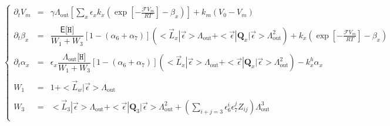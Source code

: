 \documentclass[aps,onecolumn,11pt]{revtex4}
\newcommand{\mychem}[1]{\mathtt{#1}}
\newcommand{\myconc}[1]{\big[#1\big]}
\newcommand{\Faraday}{\mathcal{F}}
\newcommand{\spproton}{\mychem{H}}
\newcommand{\proton}{\myconc{\spproton}}
\newcommand{\myout}[1]{{#1}_{\mathrm{out}}}
\newcommand{\mymat}[1]{{\bm{#1}}}
\newcommand{\LiAll}{\Lambda}
\newcommand{\LiAllOut}{\myout{\LiAll}}
\begin{document}
\begin{equation}
\left\lbrace
\begin{array}{rcl}
\partial_t V_m & = & \gamma\LiAllOut \left[\sum_x \epsilon_x k_x \left( \exp\left[ -\frac{\Faraday V_m}{RT}\right] -\beta_x \right)  \right] + k_m\left(V_0-V_m\right)\\
\\
	\partial_t \beta_x & = & 
	\dfrac{\mathsf{E}\proton}{W_1+W_3} \left[1-(\alpha_{6}+\alpha_{7})\right] \left( <\vec{L}_x|\vec{\epsilon}> \LiAllOut + <\vec{\epsilon}|\mymat{Q}_x|\vec{\epsilon}>\LiAllOut^2\right) 
	+ k_x \left(\exp\left[-\frac{\Faraday V_m}{RT}\right] - \beta_x\right)\\
	\\
	\partial_t \alpha_{x} & = &  \epsilon_x  \dfrac{\LiAllOut \proton}{W_1+W_3} \left[1-(\alpha_{6}+\alpha_{7})\right] \left( <\vec{L}_x|\vec{\epsilon}> \LiAllOut + <\vec{\epsilon}|\mymat{Q}_x|\vec{\epsilon}>\LiAllOut^2\right) 
	- k_x^h \alpha_{x}
	\\
	\\
	W_1 & = & 1 +  <\vec{L}_w | \vec{\epsilon}> \LiAllOut \\
	\\
	W_3 & = & \displaystyle <\vec{L}_3|\vec{\epsilon}> \LiAllOut + <\vec{\epsilon}|\mymat{Q}_3|\vec{\epsilon}> \LiAllOut^2+ \left(\sum_{i+j=3}\epsilon_6^i \epsilon_7^j Z_{ij}\right) \LiAllOut^3 \\
\end{array}
\right.
\end{equation}
\end{document}
